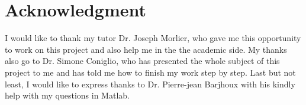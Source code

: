 \documentclass[conference]{IEEEtran}
\begin{document}
 

\section*{Acknowledgment}
I would like to thank my tutor Dr. Joseph Morlier, who gave me this opportunity to work on this project and also help me in the the academic side. My thanks also go to Dr. Simone Coniglio, who has presented the whole subject of this project to me and has told me how to finish my work step by step. Last but not least, I would like to express thanks to Dr. Pierre-jean Barjhoux with his kindly help with my questions in Matlab.



\end{document}
